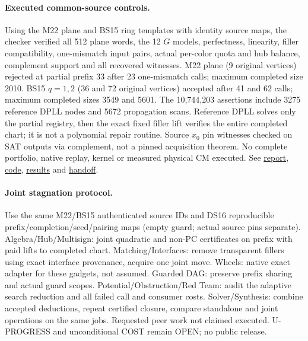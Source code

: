 \documentclass[11pt]{article}
\begin{document}
\paragraph{Executed common-source controls.}
Using the M22 plane and BS15 ring templates with identity source maps, the checker verified all 512 plane words, the 12 $G$ models, perfectness, linearity, filler compatibility, one-mismatch input pairs, actual per-color quota and hub balance, complement support and all recovered witnesses. M22 plane (9 original vertices) rejected at partial prefix 33 after 23 one-mismatch calls; maximum completed size 2010. BS15 $q=1,2$ (36 and 72 original vertices) accepted after 41 and 62 calls; maximum completed sizes 3549 and 5601. The 10,744,203 assertions include 3275 reference DPLL nodes and 5672 propagation scans. Reference DPLL solves only the partial registry, then the exact fixed filler lift verifies the entire completed chart; it is not a polynomial repair routine. Source $x_0$ pin witnesses checked on SAT outputs via complement, not a pinned acquisition theorem. No complete portfolio, native replay, kernel or measured physical CM executed. See \href{https://github.com/j15marti/pnp/commit/a5a56d0fd5a81b7befe42fa4b2ac6e839c59ad30}{report}, \href{https://github.com/j15marti/pnp/commit/48558486b65d453a37d983c72279ecf9c382c05b}{code}, \href{https://github.com/j15marti/pnp/commit/317c703907f30b37c94b1c44dfb2ea4a6c333046}{results} and \href{https://github.com/j15marti/pnp/commit/b8b05805b96a959c2af27d37af54ed1a3586ae1d}{handoff}.

\paragraph{Joint stagnation protocol.}
Use the same M22/BS15 authenticated source IDs and DS16 reproducible prefix/completion/seed/pairing maps (empty guard; actual source pins separate). Algebra/Hub/Multisign: joint quadratic and non-PC certificates on prefix with paid lifts to completed chart. Matching/Interfaces: remove transparent fillers using exact interface provenance, acquire one joint move. Wheels: native exact adapter for these gadgets, not assumed. Guarded DAG: preserve prefix sharing and actual guard scopes. Potential/Obstruction/Red Team: audit the adaptive search reduction and all failed call and consumer costs. Solver/Synthesis: combine accepted deductions, repeat certified closure, compare standalone and joint operations on the same jobs. Requested peer work not claimed executed. U-PROGRESS and unconditional COST remain OPEN; no public release.
\end{document}
